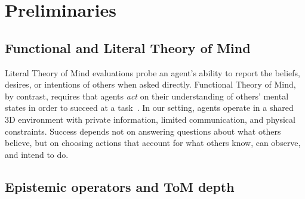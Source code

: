 \documentclass{article} %
\begin{document}








\section{Preliminaries}
\label{sec:preliminaries}

\subsection{Functional and Literal Theory of Mind}
\label{sec:func_tom}

Literal Theory of Mind evaluations probe an agent's ability to report the beliefs, desires, or intentions of others when asked directly. Functional Theory of Mind, by contrast, requires that agents \emph{act} on their understanding of others' mental states in order to succeed at a task~\citep{street2024llms}. In our setting, agents operate in a shared 3D environment with private information, limited communication, and physical constraints. Success depends not on answering questions about what others believe, but on choosing actions that account for what others know, can observe, and intend to do.


\subsection{Epistemic operators and ToM depth}
\label{sec:epistemic_ops}
\end{document}
